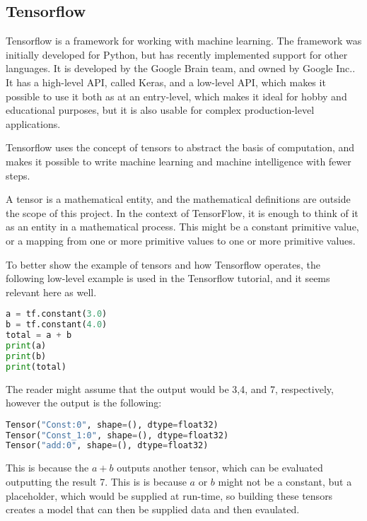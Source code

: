 \subsection{Tensorflow}
Tensorflow is a framework for working with machine learning\cite{tensorflow2015-whitepaper}.
The framework was initially developed for Python, but has recently implemented support for other languages.
It is developed by the Google Brain team, and owned by Google Inc.\cite{tensorflow-attribution}.
It has a high-level API, called Keras, and a low-level API, which makes it possible to use it both as at an entry-level, which makes it ideal for hobby and educational purposes, but it is also usable for complex production-level applications.

Tensorflow uses the concept of tensors to abstract the basis of computation, and makes it possible to write machine learning and machine intelligence with fewer steps.

A tensor is a mathematical entity, and the mathematical definitions are outside the scope of this project.
In the context of TensorFlow, it is enough to think of it as an entity in a mathematical process.
This might be a constant primitive value, or a mapping from one or more primitive values to one or more primitive values.

To better show the example of tensors and how Tensorflow operates, the following low-level example is used in the Tensorflow tutorial, and it seems relevant here as well.

\begin{lstlisting}[language=Python,label=lis:TensorFlowPy1,caption=Example of a Tensorflow program]
a = tf.constant(3.0)
b = tf.constant(4.0)
total = a + b
print(a)
print(b)
print(total)
\end{lstlisting}
The reader might assume that the output would be 3,4, and 7, respectively, however the output is the following:
\begin{lstlisting}[language=Python,label=lis:TensorFlowPy2,caption=Output of example \autoref{lis:TensorFlowPy2}]
Tensor("Const:0", shape=(), dtype=float32)
Tensor("Const_1:0", shape=(), dtype=float32)
Tensor("add:0", shape=(), dtype=float32)
\end{lstlisting}
This is because the $ a + b $ outputs another tensor, which can be evaluated outputting the result 7.
This is is because $a$ or $b$ might not be a constant, but a placeholder, which would be supplied at run-time, so building these tensors creates a model that can then be supplied data and then evaulated.

